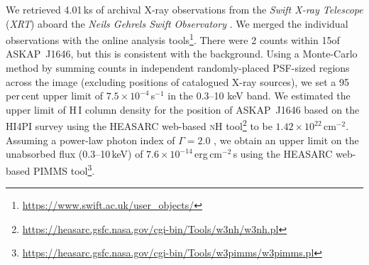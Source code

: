 \documentclass[fleqn,usenatbib]{mnras}
\newcommand{\blinkyaskap}{{ASKAP}~J1646}
\begin{document}
{We retrieved 4.01\,ks of archival X-ray observations from the \textit{Swift X-ray Telescope} (\textit{XRT}) aboard the \textit{Neils Gehrels Swift Observatory} \citep{2005SSRv..120..165B}. We merged the individual observations with the online analysis tools\footnote{\url{https://www.swift.ac.uk/user_objects/}}. There were 2 counts within 15\arcsec of \blinkyaskap{}, but this is consistent with the background. Using a Monte-Carlo method by summing counts in independent randomly-placed PSF-sized regions across the image (excluding positions of catalogued X-ray sources), we set a 95\,per\,cent upper limit of $7.5\times 10^{-4}$\,s$^{-1}$ in the 0.3--10 keV band.
We estimated the upper limit of H\,I column density for the position of \blinkyaskap{} based on the HI4PI survey \citep{2016A&A...594A.116H} using the HEASARC web-based \textsc{nH} tool\footnote{\url{https://heasarc.gsfc.nasa.gov/cgi-bin/Tools/w3nh/w3nh.pl}} to be $1.42\times 10^{22}$\,cm$^{-2}$.
Assuming a power-law photon index of $\Gamma=2.0$ \citep[e.g.][]{2018ApJ...864...23L}, we obtain an upper limit on the unabsorbed flux (0.3--10\,keV) of $7.6\times 10^{-14}$\,erg\,cm$^{-2}$\,s using the HEASARC web-based \textsc{PIMMS} tool\footnote{\url{https://heasarc.gsfc.nasa.gov/cgi-bin/Tools/w3pimms/w3pimms.pl}}}.
\end{document}
